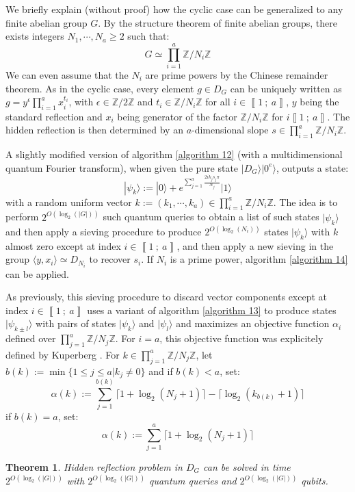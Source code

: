 \documentclass[a4paper,10pt]{report}
\theoremstyle{definition}
\theoremstyle{plain}
\newtheorem{theorem}[definition]{Theorem}
\theoremstyle{definition}
\newcommand{\Z}{\mathbb{Z}}
\renewcommand{\i}[2]{\left\llbracket #1~;~#2\right\rrbracket}
\renewcommand{\(}{\left(}
\renewcommand{\)}{\right)}
\begin{document}
We briefly explain (without proof) how the cyclic case can be generalized to any finite abelian group $G$. By the structure theorem of finite abelian groups, there exists integers $N_1,\cdots,N_a\geq 2$ such that:
\[G\simeq\prod_{i=1}^a \Z/N_i\Z\]
We can even assume that the $N_i$ are prime powers by the Chinese remainder theorem. As in the cyclic case, every element $g\in D_G$ can be uniquely written as $g=y^\epsilon \prod_{i=1}^a x_i^{t_i}$, with $\epsilon\in\Z/2\Z$ and $t_i\in\Z/N_i\Z$ for all $i\in\i{1}{a}$, $y$ being the standard reflection and $x_i$ being generator of the factor $\Z/N_i\Z$ for $i\i{1}{a}$. The hidden reflection is then determined by an $a$-dimensional slope $s\in\prod_{i=1}^a \Z/N_i\Z$.

A slightly modified version of algorithm \ref{algorithm 12} (with a multidimensional quantum Fourier transform), when given the pure state $|D_G\rangle|0^e\rangle$, outputs a state:
\[|\psi_k\rangle:=|0\rangle +e^{\sum_{j=1}^a \frac{2ik_js_j\pi}{N_j}}|1\rangle\]
with a random uniform vector $k:=(k_1, \cdots, k_a)\in\prod_{i=1}^a \Z/N_i\Z$. The idea is to perform $2^{O(\log_2(|G|))}$ such quantum queries to obtain a list of such states $|\psi_k\rangle$ and then apply a sieving procedure to produce $2^{O(\log_2(N_i))}$ states $|\psi_k\rangle$ with $k$ almost zero except at index $i\in\i{1}{a}$, and then apply a new sieving in the group $\langle y, x_i\rangle\simeq D_{N_i}$ to recover $s_i$.  If $N_i$ is a prime power, algorithm \ref{algorithm 14} can be applied.

As previously, this sieving procedure to discard vector components except at index $i\in\i{1}{a}$ uses a variant of algorithm \ref{algorithm 13} to produce states $|\psi_{k\pm l}\rangle$ with pairs of states $|\psi_k\rangle$ and $|\psi_l\rangle$ and maximizes an objective function $\alpha_i$ defined over $\prod_{j=1}^a \Z/N_j\Z$. For $i=a$, this objective function was explicitely defined by Kuperberg \cite[proof of theorem 7.1]{Kuperberg}. For $k\in\prod_{j=1}^a \Z/N_j\Z$, let $b(k):=\min\{1\leq j\leq a| k_j\neq 0\}$ and if $b(k)<a$, set:
\[\alpha(k):=\sum_{j=1}^{b(k)}\lceil 1+\log_2(N_j+1)\rceil -\lceil\log_2(k_{b(k)}+1)\rceil\]
if $b(k)=a$, set:
\[\alpha(k):=\sum_{j=1}^{a}\lceil 1+\log_2(N_j+1)\rceil\]

\begin{theorem}
Hidden reflection problem in $D_G$ can be solved in time $2^{O(\log_2(|G|))}$ with $2^{O(\log_2(|G|))}$ quantum queries and $2^{O(\log_2(|G|))}$ qubits.
\end{theorem}
\end{document}
